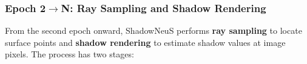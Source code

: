 \documentclass[12pt,a4paper]{article}
\theoremstyle{definition}
\begin{document}


\subsubsection{Epoch 2$\to$N: Ray Sampling and Shadow Rendering} \label{sec:epoch2_ray_sampling}

From the second epoch onward, ShadowNeuS performs \textbf{ray sampling} to locate surface points and \textbf{shadow rendering} to estimate shadow values at image pixels. The process has two stages:
\end{document}
